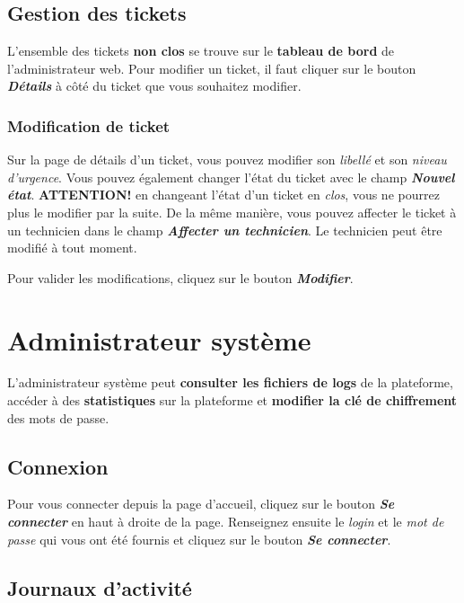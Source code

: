\documentclass[12pt, a4paper]{article}
\begin{document}
\subsection*{Gestion des tickets}

L'ensemble des tickets \textbf{non clos} se trouve sur le \textbf{tableau de bord} de l'administrateur web.
Pour modifier un ticket, il faut cliquer sur le bouton \textit{\textbf{Détails}} à côté du ticket que vous souhaitez modifier.

\subsubsection*{Modification de ticket}

Sur la page de détails d'un ticket, vous pouvez modifier son \textit{libellé} et son \textit{niveau d'urgence}.
Vous pouvez également changer l'état du ticket avec le champ \textit{\textbf{Nouvel état}}.
\textbf{ATTENTION!} en changeant l'état d'un ticket en \textit{clos}, vous ne pourrez plus le modifier par la suite.
De la même manière, vous pouvez affecter le ticket à un technicien dans le champ \textit{\textbf{Affecter un technicien}}.
Le technicien peut être modifié à tout moment.

\bigskip
\noindent Pour valider les modifications, cliquez sur le bouton \textit{\textbf{Modifier}}.

\section{Administrateur système}

L'administrateur système peut \textbf{consulter les fichiers de logs} de la plateforme, accéder à des \textbf{statistiques} sur la plateforme et
\textbf{modifier la clé de chiffrement} des mots de passe.

\subsection*{Connexion}

Pour vous connecter depuis la page d'accueil, cliquez sur le bouton \textit{\textbf{Se connecter}} en haut à droite de la page.
Renseignez ensuite le \textit{login} et le \textit{mot de passe} qui vous ont été fournis et cliquez sur le bouton \textit{\textbf{Se connecter}}.

\subsection*{Journaux d'activité}
\end{document}
